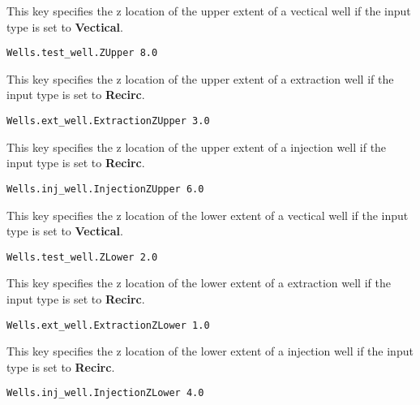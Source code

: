{
This key specifies the z location of the upper extent of a vectical well
if the input type is set to {\bf Vectical}.
}
\begin{display}\begin{verbatim}
Wells.test_well.ZUpper 8.0
\end{verbatim}\end{display}

{
This key specifies the z location of the upper extent of a extraction
well if the input type is set to {\bf Recirc}.
}
\begin{display}\begin{verbatim}
Wells.ext_well.ExtractionZUpper 3.0
\end{verbatim}\end{display}

{
This key specifies the z location of the upper extent of a injection
well if the input type is set to {\bf Recirc}.
}
\begin{display}\begin{verbatim}
Wells.inj_well.InjectionZUpper 6.0
\end{verbatim}\end{display}

{
This key specifies the z location of the lower extent of a vectical well
if the input type is set to {\bf Vectical}.
}
\begin{display}\begin{verbatim}
Wells.test_well.ZLower 2.0
\end{verbatim}\end{display}

{
This key specifies the z location of the lower extent of a extraction
well if the input type is set to {\bf Recirc}.
}
\begin{display}\begin{verbatim}
Wells.ext_well.ExtractionZLower 1.0
\end{verbatim}\end{display}

{
This key specifies the z location of the lower extent of a injection
well if the input type is set to {\bf Recirc}.
}
\begin{display}\begin{verbatim}
Wells.inj_well.InjectionZLower 4.0
\end{verbatim}\end{display}

